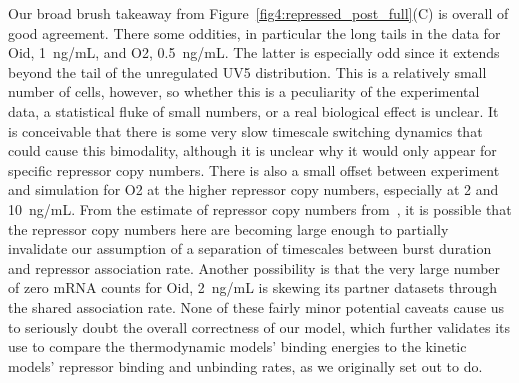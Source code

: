 Our broad brush takeaway from Figure~\ref{fig4:repressed_post_full}(C) is
overall of good agreement. There some oddities, in particular the long tails in
the data for Oid, 1~ng/mL, and O2, 0.5~ng/mL. The latter is especially odd since
it extends beyond the tail of the unregulated UV5 distribution. This is a
relatively small number of cells, however, so whether this is a peculiarity of
the experimental data, a statistical fluke of small numbers, or a real
biological effect is unclear. It is conceivable that there is some very slow
timescale switching dynamics that could cause this bimodality, although it is
unclear why it would only appear for specific repressor copy numbers. There is
also a small offset between experiment and simulation for O2 at the higher
repressor copy numbers, especially at 2 and 10~ng/mL. From the estimate of
repressor copy numbers from~\cite{Jones2014}, it is possible that the repressor
copy numbers here are becoming large enough to partially invalidate our
assumption of a separation of timescales between burst duration and repressor
association rate. Another possibility is that the very large number of zero mRNA
counts for Oid, 2~ng/mL is skewing its partner datasets through the shared
association rate. None of these fairly minor potential caveats cause us to
seriously doubt the overall correctness of our model, which further validates
its use to compare the thermodynamic models' binding energies to the kinetic
models' repressor binding and unbinding rates, as we originally set out to do.